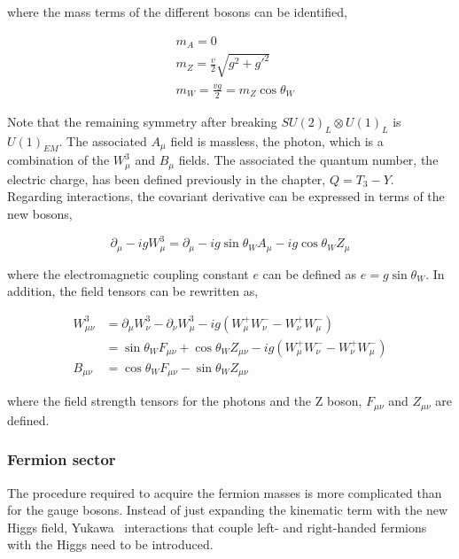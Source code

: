 where the mass terms of the different bosons can be identified,

\begin{equation}
\begin{split}
    &m_A = 0\\
    &m_Z = \frac{v}{2}\sqrt{g^2+g'^2}\\
    &m_W = \frac{vg}{2} = m_Z \cos\theta_W
\end{split}
\end{equation}

Note that the remaining symmetry after breaking $SU(2)_L\otimes U(1)_L$ is $U(1)_{EM}$. The associated $A_\mu$ field is massless, the photon, which is a combination of the $W_\mu^3$ and $B_\mu$ fields. The associated the quantum number, the electric charge, has been defined previously in the chapter, $Q = T_3-Y$.\\

Regarding interactions, the covariant derivative can be expressed in terms of the new bosons,

\begin{equation}
    \partial_\mu - igW_\mu^3 = \partial_\mu - ig\sin\theta_W A_\mu - ig\cos\theta_W Z_\mu
\end{equation}

where the electromagnetic coupling constant $e$ can be defined as $e=g\sin\theta_W$. In addition, the field tensors can be rewritten as,

\begin{equation}
\begin{split}
    W_{\mu\nu}^3 &= \partial_\mu W_\nu^3 - \partial_\nu W_\mu^3 - ig(W_\mu^+W_\nu^- - W_\nu^+ W_\mu^-)\\
    &= \sin\theta_W F_{\mu\nu} + \cos\theta_W Z_{\mu\nu} - ig(W_\mu^+W_\nu^- - W_\nu^+ W_\mu^-)\\
    B_{\mu\nu} &= \cos\theta_W F_{\mu\nu} - \sin\theta_W Z_{\mu\nu}
\end{split}
\end{equation}

where the field strength tensors for the photons and the Z boson, $F_{\mu\nu}$ and $Z_{\mu\nu}$ are defined.

\subsubsection{Fermion sector}

The procedure required to acquire the fermion masses is more complicated than for the gauge bosons. Instead of just expanding the kinematic term with the new Higgs field, Yukawa~\cite{yukawa} interactions that couple left- and right-handed fermions with the Higgs need to be introduced.\\

